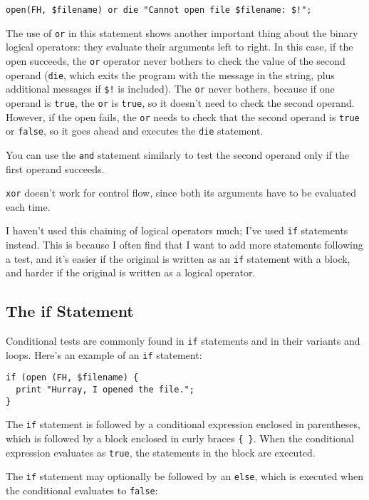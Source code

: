 \begin{lstlisting}
open(FH, $filename) or die "Cannot open file $filename: $!";
\end{lstlisting}

The use of \verb|or| in this statement shows another important thing about the binary logical operators: they evaluate their arguments left to right. In this case, if the open succeeds, the \verb|or| operator never bothers to check the value of the second operand (\verb|die|, which exits the program with the message in the string, plus additional messages if \verb|$!| is included).  The \verb|or| never bothers, because if one operand is \verb|true|, the \verb|or| is \verb|true|, so it doesn't need to check the second operand. However, if the open fails, the \verb|or| needs to check that the second operand is \verb|true| or \verb|false|, so it goes ahead and executes the \verb|die| statement.

You can use the \verb|and| statement similarly to test the second operand only if the first operand succeeds.

\verb|xor| doesn't work for control flow, since both its arguments have to be evaluated each time.

I haven't used this chaining of logical operators much; I've used \verb|if| statements instead. This is because I often find that I want to add more statements following a test, and it's easier if the original is written as an \verb|if| statement with a block, and harder if the original is written as a logical operator.

\subsection{The if Statement}
Conditional tests are commonly found in \verb|if| statements and in their
variants and loops. Here's an example of an \verb|if| statement:

\begin{lstlisting}
if (open (FH, $filename) {
  print "Hurray, I opened the file.";
}
\end{lstlisting}

The \verb|if| statement is followed by a conditional expression enclosed in parentheses, which is followed by a block enclosed in curly braces \verb|{ }|. When the conditional expression evaluates as \verb|true|, the statements in the block are executed.

The \verb|if| statement may optionally be followed by an \verb|else|, which is executed when the conditional evaluates to \verb|false|:

